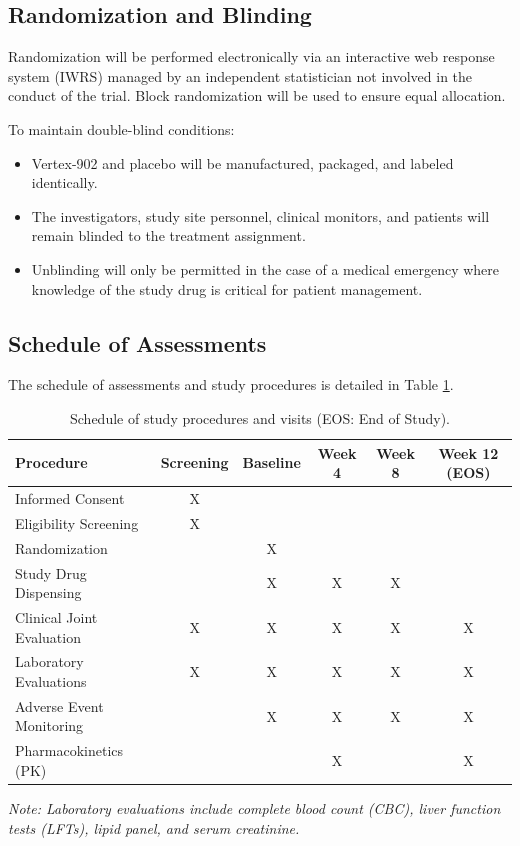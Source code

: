 \subsection{Randomization and Blinding}
Randomization will be performed electronically via an interactive web response system (IWRS) managed by an independent statistician not involved in the conduct of the trial. Block randomization will be used to ensure equal allocation. 

To maintain double-blind conditions:
\begin{itemize}
    \item Vertex-902 and placebo will be manufactured, packaged, and labeled identically.
    \item The investigators, study site personnel, clinical monitors, and patients will remain blinded to the treatment assignment.
    \item Unblinding will only be permitted in the case of a medical emergency where knowledge of the study drug is critical for patient management.
\end{itemize}

\subsection{Schedule of Assessments}
The schedule of assessments and study procedures is detailed in Table \ref{tab:schedule}.

\begin{table}[htbp]
\centering
\sffamily
\small
\begin{tabularx}{\textwidth}{>{\raggedright\arraybackslash}X c c c c c}
\toprule
\textbf{Procedure} & \textbf{Screening} & \textbf{Baseline} & \textbf{Week 4} & \textbf{Week 8} & \textbf{Week 12 (EOS)} \\
\midrule
Informed Consent & X & & & & \\
Eligibility Screening & X & & & & \\
Randomization & & X & & & \\
Study Drug Dispensing & & X & X & X & \\
Clinical Joint Evaluation & X & X & X & X & X \\
Laboratory Evaluations & X & X & X & X & X \\
Adverse Event Monitoring & & X & X & X & X \\
Pharmacokinetics (PK) & & & X & & X \\
\bottomrule
\end{tabularx}
\caption{Schedule of study procedures and visits (EOS: End of Study).}
\label{tab:schedule}
\end{table}
\footnotesize \textit{Note: Laboratory evaluations include complete blood count (CBC), liver function tests (LFTs), lipid panel, and serum creatinine.}
